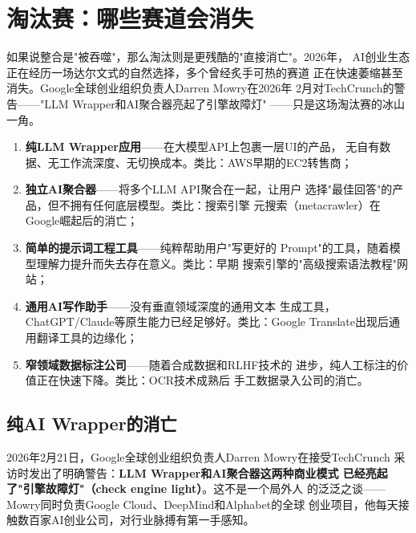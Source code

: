 \section{淘汰赛：哪些赛道会消失}
\label{sec:outlook-elimination}

如果说整合是"被吞噬"，那么淘汰则是更残酷的"直接消亡"。2026年，
AI创业生态正在经历一场达尔文式的自然选择，多个曾经炙手可热的赛道
正在快速萎缩甚至消失。Google全球创业组织负责人Darren Mowry在2026年
2月对TechCrunch的警告——"LLM Wrapper和AI聚合器亮起了引擎故障灯"
——只是这场淘汰赛的冰山一角。

\begin{warnbox}[即将消失的五个AI赛道]
\begin{enumerate}
  \item \textbf{纯LLM Wrapper应用}——在大模型API上包裹一层UI的产品，
    无自有数据、无工作流深度、无切换成本。类比：AWS早期的EC2转售商；
  \item \textbf{独立AI聚合器}——将多个LLM API聚合在一起，让用户
    选择"最佳回答"的产品，但不拥有任何底层模型。类比：搜索引擎
    元搜索（metacrawler）在Google崛起后的消亡；
  \item \textbf{简单的提示词工程工具}——纯粹帮助用户"写更好的
    Prompt"的工具，随着模型理解力提升而失去存在意义。类比：早期
    搜索引擎的"高级搜索语法教程"网站；
  \item \textbf{通用AI写作助手}——没有垂直领域深度的通用文本
    生成工具，ChatGPT/Claude等原生能力已经足够好。类比：Google
    Translate出现后通用翻译工具的边缘化；
  \item \textbf{窄领域数据标注公司}——随着合成数据和RLHF技术的
    进步，纯人工标注的价值正在快速下降。类比：OCR技术成熟后
    手工数据录入公司的消亡。
\end{enumerate}
\end{warnbox}


\subsection{纯AI Wrapper的消亡}
\label{subsec:outlook-wrapper-death}

2026年2月21日，Google全球创业组织负责人Darren Mowry在接受TechCrunch
采访时发出了明确警告：\textbf{LLM Wrapper和AI聚合器这两种商业模式
已经亮起了"引擎故障灯"（check engine light）}。这不是一个局外人
的泛泛之谈——Mowry同时负责Google Cloud、DeepMind和Alphabet的全球
创业项目，他每天接触数百家AI创业公司，对行业脉搏有第一手感知。


